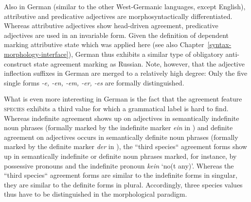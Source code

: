 Also in German (similar to the other West-Germanic languages, except English), attributive and predicative adjectives are morphosyntactically differentiated. Whereas attributive adjectives show head-driven agreement, predicative adjectives are used in an invariable form. Given the definition of dependent marking attributive state which was applied here (see also Chapter~\ref{syntax-morphology-interface}), German thus exhibits a similar type of obligatory anti-construct state agreement marking as Russian. Note, however, that the adjective inflection suffixes in German are merged to a relatively high degree: Only the five single forms \textit{-e, -en, -em, -er, -es} are formally distinguished. 

What is even more interesting in German is the fact that the agreement feature \textsc{species} exhibits a third value for which a grammatical label is hard to find. Whereas indefinite agreement shows up on adjectives in semantically indefinite noun phrases (formally marked by the indefinite marker \textit{ein} in ) and definite agreement on adjectives occurs in semantically definite noun phrases (formally marked by the definite marker \textit{der} in ), the “third species“ agreement forms show up in semantically indefinite or definite noun phrases marked, for instance, by possessive pronouns and the indefinite pronoun \textit{kein} ‘no(t any)’. Whereas the “third species“ agreement forms are similar to the indefinite forms in singular, they are similar to the definite forms in plural. Accordingly, three species values thus have to be distinguished in the morphological paradigm.

